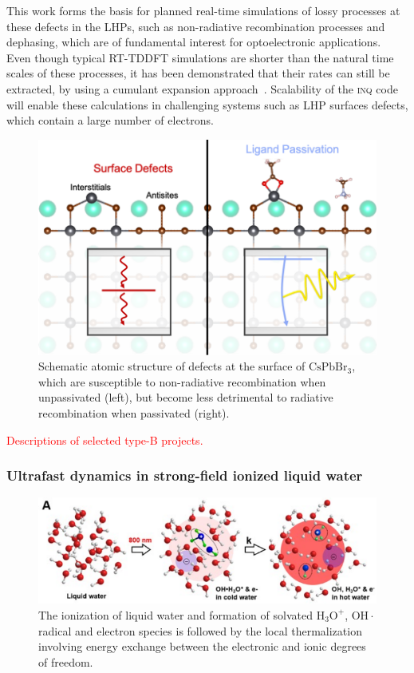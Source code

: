 This work forms the basis for planned real-time simulations of lossy processes at these defects in the LHPs, such as non-radiative recombination processes and dephasing, which are of fundamental interest for optoelectronic applications. 
Even though typical RT-TDDFT simulations are shorter than the natural time scales of these processes, it has been demonstrated that their rates can still be extracted, by using a cumulant expansion approach~\cite{Qiao2020}. 
Scalability of the \textsc{inq} code will enable these calculations in challenging systems such as LHP surfaces defects, which contain a large number of electrons.     

\begin{figure}[h]
	\centering
	\includegraphics{figures/defect_passivation}
	\caption{
		Schematic atomic structure of defects at the surface of \(\mathrm{CsPbBr_3}\), which are susceptible to non-radiative recombination when unpassivated (left), but become less detrimental to radiative recombination when passivated (right).
	}
	\label{fig:defect}
\end{figure}

\textcolor{red}{Descriptions of selected type-B projects.}

\subsubsection{Ultrafast dynamics in strong-field ionized liquid water} 

\begin{figure}[h]
	\centering
	\includegraphics{figures/Water}
	\caption{
		The ionization of liquid water and formation of solvated \(\mathrm{H_3O^+}\), \(\mathrm{OH\cdot}\) radical and electron species is followed by the local thermalization involving energy exchange between the electronic and ionic degrees of freedom.
	}
	\label{fig:water}
\end{figure}

